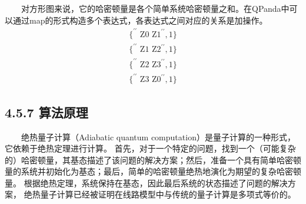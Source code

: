 \documentclass[a4paper,11pt,english]{sphinxmanual}
\begin{document}
\sphinxAtStartPar
  对方形图来说，它的哈密顿量是各个简单系统哈密顿量之和。在QPanda中可以通过map的形式构造多个表达式，各表达式之间对应的关系是加操作。
\begin{equation*}
\begin{split}\{ ^{\prime \prime} \text { Z0 Z1}^{\prime \prime} \text{} ,1\}\end{split}
\end{equation*}\begin{equation*}
\begin{split}\{ ^{\prime \prime} \text { Z1 Z2}^{\prime \prime} \text{} ,1\}\end{split}
\end{equation*}\begin{equation*}
\begin{split}\{ ^{\prime \prime} \text { Z2 Z3}^{\prime \prime} \text{} ,1\}\end{split}
\end{equation*}\begin{equation*}
\begin{split}\{ ^{\prime \prime} \text { Z3 Z0}^{\prime \prime} \text{} ,1\}\end{split}
\end{equation*}

\subsection{4.5.7 算法原理}
\label{\detokenize{rst/4.5QAOA_u7b97_u6cd5:id7}}
\sphinxAtStartPar
{}

\sphinxAtStartPar
  绝热量子计算（Adiabatic quantum computation）是量子计算的一种形式，它依赖于绝热定理进行计算。 首先，对于一个特定的问题，找到一个（可能复杂的）哈密顿量，其基态描述了该问题的解决方案；然后，准备一个具有简单哈密顿量的系统并初始化为基态；最后，简单的哈密顿量绝热地演化为期望的复杂哈密顿量。 根据绝热定理，系统保持在基态，因此最后系统的状态描述了问题的解决方案， 绝热量子计算已经被证明在线路模型中与传统的量子计算是多项式等价的。
\end{document}
